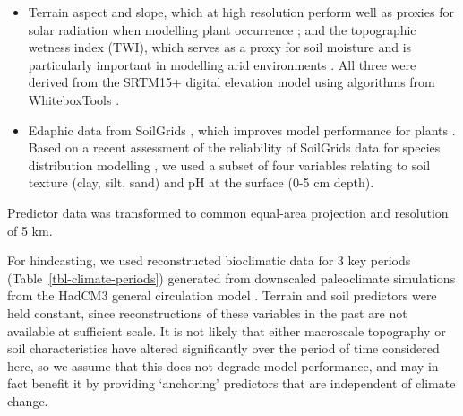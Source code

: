 \documentclass[
  authoryear,
  review]{elsarticle}
\providecommand{\tightlist}{%
  \setlength{\itemsep}{0pt}\setlength{\parskip}{0pt}}\usepackage{longtable,booktabs,array}
\begin{document}
\begin{itemize}
\tightlist
\item
  Terrain aspect and slope, which at high resolution perform well as
  proxies for solar radiation when modelling plant occurrence
  \citep{AustinVanNiel2011, LeempoelEtAl2015}; and the topographic
  wetness index (TWI), which serves as a proxy for soil moisture and is
  particularly important in modelling arid environments
  \citep{KopeckyCizkova2010, CamposEtAl2016, DiVirgilioEtAl2018}. All
  three were derived from the SRTM15+ digital elevation model using
  algorithms from WhiteboxTools \citep{Lindsay2016}.
\end{itemize}

\begin{itemize}
\tightlist
\item
  Edaphic data from SoilGrids \citep{HenglEtAl2014, HenglEtAl2017},
  which improves model performance for plants
  \citep{DubuisEtAl2013, ModEtAl2016, VelazcoEtAl2017}. Based on a
  recent assessment of the reliability of SoilGrids data for species
  distribution modelling \citep{MillerEtAl2024}, we used a subset of
  four variables relating to soil texture (clay, silt, sand) and pH at
  the surface (0-5 cm depth).
\end{itemize}

Predictor data was transformed to common equal-area projection and
resolution of 5 km.

\begin{table}

\caption{\label{tbl-climate-periods}}


\end{table}%

For hindcasting, we used reconstructed bioclimatic data for 3 key
periods (Table~\ref{tbl-climate-periods}) generated from downscaled
paleoclimate simulations from the HadCM3 general circulation model
\citep{BrownEtAl2018}. Terrain and soil predictors were held constant,
since reconstructions of these variables in the past are not available
at sufficient scale. It is not likely that either macroscale topography
or soil characteristics have altered significantly over the period of
time considered here, so we assume that this does not degrade model
performance, and may in fact benefit it by providing `anchoring'
predictors that are independent of climate change.
\end{document}

